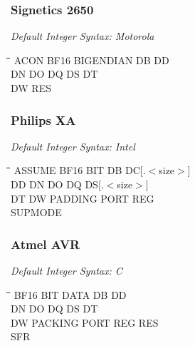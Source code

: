 \subsubsection{Signetics 2650}

{\em Default Integer Syntax: Motorola}

{\tt\begin{tabbing}
\hspace{3cm}\=\hspace{3cm}\=\hspace{3cm}\=\hspace{3cm}\=\kill
ACON       \> BF16       \> BIGENDIAN   \> DB          \> DD \\
DN         \> DO         \> DQ          \> DS          \> DT \\
DW         \> RES \\
\end{tabbing}}

\subsubsection{Philips XA}

{\em Default Integer Syntax: Intel}

{\tt\begin{tabbing}
\hspace{3cm}\=\hspace{3cm}\=\hspace{3cm}\=\hspace{3cm}\=\kill
ASSUME     \> BF16        \> BIT         \> DB          \> DC[.$<$size$>$] \\
DD         \> DN          \> DO          \> DQ          \> DS[.$<$size$>$] \\
DT         \> DW          \> PADDING     \> PORT        \> REG             \\
SUPMODE \\
\end{tabbing}}

\subsubsection{Atmel AVR}

{\em Default Integer Syntax: C}

{\tt\begin{tabbing}
\hspace{3cm}\=\hspace{3cm}\=\hspace{3cm}\=\hspace{3cm}\=\kill
BF16       \> BIT        \> DATA        \> DB           \> DD \\
DN         \> DO         \> DQ          \> DS           \> DT \\
DW         \> PACKING    \> PORT        \> REG          \> RES \\
SFR \\
\end{tabbing}}

